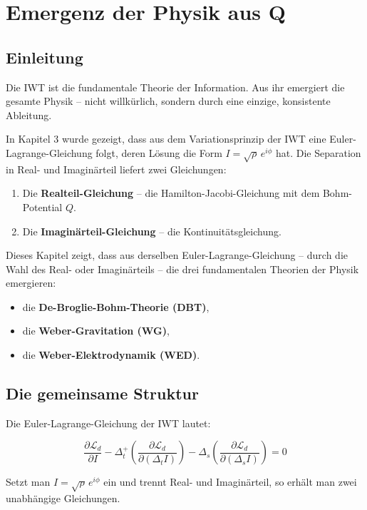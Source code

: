 \chapter{Emergenz der Physik aus Q}

\section{Einleitung}

Die IWT ist die fundamentale Theorie der Information. Aus ihr emergiert die gesamte Physik – nicht willkürlich, sondern durch eine einzige, konsistente Ableitung.

In Kapitel 3 wurde gezeigt, dass aus dem Variationsprinzip der IWT eine Euler-Lagrange-Gleichung folgt, deren Lösung die Form \( I = \sqrt{\rho} \, e^{i\phi} \) hat. Die Separation in Real- und Imaginärteil liefert zwei Gleichungen:

\begin{enumerate}
\item Die \textbf{Realteil-Gleichung} – die Hamilton-Jacobi-Gleichung mit dem Bohm-Potential \( Q \).
\item Die \textbf{Imaginärteil-Gleichung} – die Kontinuitätsgleichung.
\end{enumerate}

Dieses Kapitel zeigt, dass aus derselben Euler-Lagrange-Gleichung – durch die Wahl des Real- oder Imaginärteils – die drei fundamentalen Theorien der Physik emergieren:

\begin{itemize}
\item die \textbf{De-Broglie-Bohm-Theorie (DBT)},
\item die \textbf{Weber-Gravitation (WG)},
\item die \textbf{Weber-Elektrodynamik (WED)}.
\end{itemize}

\section{Die gemeinsame Struktur}

Die Euler-Lagrange-Gleichung der IWT lautet:

\[
\frac{\partial \mathcal{L}_d}{\partial I} - \Delta_t^+ \left( \frac{\partial \mathcal{L}_d}{\partial (\Delta_t I)} \right) - \Delta_s \left( \frac{\partial \mathcal{L}_d}{\partial (\Delta_s I)} \right) = 0
\]

Setzt man \( I = \sqrt{\rho} \, e^{i\phi} \) ein und trennt Real- und Imaginärteil, so erhält man zwei unabhängige Gleichungen.

